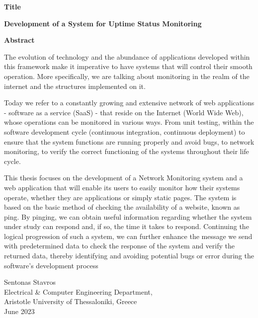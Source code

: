 {\selectfont

{}


\begin{center}
  \centering
  \textbf{\Large{Title}}
  \vspace{0.5cm}

  \textbf{\large{Development of a System for Uptime Status Monitoring}}
  \vspace{1cm}

  \centering
  \textbf{Abstract}
\end{center}

The evolution of technology and the abundance of applications developed within this framework make it imperative to have systems that will control their smooth operation. More specifically, we are talking about monitoring in the realm of the internet and the structures implemented on it.

Today we refer to a constantly growing and extensive network of web applications - software as a service (SaaS) - that reside on the Internet (World Wide Web), whose operations can be monitored in various ways. From unit testing, within the software development cycle (continuous integration, continuous deployment) to ensure that the system functions are running properly and avoid bugs, to network monitoring, to verify the correct functioning of the systems throughout their life cycle.

This thesis focuses on the development of a Network Monitoring system and a web application that will enable its users to easily monitor how their systems operate, whether they are applications or simply static pages. The system is based on the basic method of checking the availability of a website, known as ping. By pinging, we can obtain useful information regarding whether the system under study can respond and, if so, the time it takes to respond. Continuing the logical progression of such a system, we can further enhance the message we send with predetermined data to check the response of the system and verify the returned data, thereby identifying and avoiding potential bugs or error during the software's development process

\begin{flushright}
  \vspace{2cm}
  Sentonas Stavros
  \\
  Electrical \& Computer Engineering Department,
  \\
  Aristotle University of Thessaloniki, Greece
  \\
  June 2023
\end{flushright}

}

